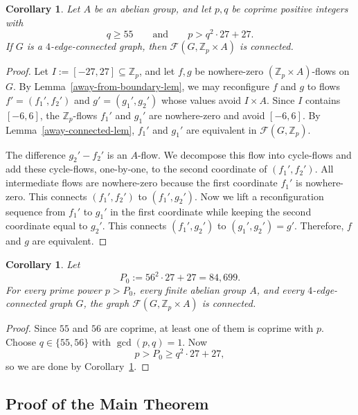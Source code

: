 \documentclass[a4paper,12pt]{article}
\theoremstyle{plain}
\newtheorem{cor}[theorem]{Corollary}
\theoremstyle{definition}
\newcommand{\Z}{\mathbb{Z}}
\newcommand\F{\mathcal{F}}
\renewcommand\ge\geqslant
\begin{document}
\begin{cor}
    \label{coprime-cor}
    Let $A$ be an abelian group, and let $p,q$ be coprime positive integers with
    \[
        q\ge55
        \qquad\text{and}\qquad
        p>q^2\cdot27+27.
    \]
    If $G$ is a $4$-edge-connected graph, then $\F(G,\Z_p\times A)$ is connected.
\end{cor}
\begin{proof}
    Let $I:=[-27,27]\subseteq\Z_p$, and let $f,g$ be nowhere-zero $(\Z_p\times A)$-flows on $G$.  By Lemma~\ref{away-from-boundary-lem}, we may reconfigure $f$ and $g$ to flows
    $%
        f'=(f_1',f_2')%
    $
    and %
    $%
        g'=(g_1',g_2')%
    $
    whose values avoid $I\times A$.
%
    Since $I$ contains $[-6,6]$, the $\Z_p$-flows $f_1'$ and $g_1'$ are nowhere-zero and avoid $[-6,6]$.  By Lemma~\ref{away-connected-lem}, $f_1'$ and $g_1'$ are equivalent in $\F(G,\Z_p)$.

    The difference $g_2'-f_2'$ is an $A$-flow.  We decompose this flow into cycle-flows and add these cycle-flows,
    one-by-one, to the second coordinate of $(f_1',f_2')$.  All intermediate flows are nowhere-zero because the first coordinate $f_1'$ is nowhere-zero.  This connects $(f_1',f_2')$ to $(f_1',g_2')$.  Now we lift a reconfiguration sequence from $f_1'$ to $g_1'$ in the first coordinate while keeping the second coordinate equal to $g_2'$.  This connects $(f_1',g_2')$ to $(g_1',g_2')=g'$.  Therefore, $f$ and $g$ are equivalent.
\end{proof}

\begin{cor}
    \label{ZpxA-cor}
    Let
    \[
        P_0:=56^2\cdot27+27=84,699.
    \]
    For every prime power $p>P_0$, every finite abelian group $A$, and every $4$-edge-connected graph $G$, the graph $\F(G,\Z_p\times A)$ is connected.
\end{cor}
\begin{proof}
    Since $55$ and $56$ are coprime, at least one of them is coprime with $p$.  Choose $q\in\{55,56\}$ with $\gcd(p,q)=1$.  Now
    \[
        p>P_0\ge q^2\cdot27+27,
    \]
    so we are done by Corollary~\ref{coprime-cor}.
\end{proof}

\subsection{Proof of the Main Theorem}
\end{document}
